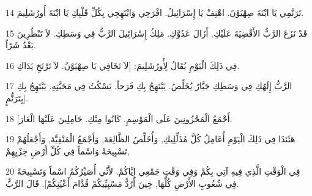 \par 14 تَرَنَّمِي يَا ابْنَةَ صِهْيَوْنَ. اهْتِفْ يَا إِسْرَائِيلُ. افْرَحِي وَابْتَهِجِي بِكُلِّ قَلْبِكِ يَا ابْنَةَ أُورُشَلِيمَ.
\par 15 قَدْ نَزَعَ الرَّبُّ الأَقْضِيَةَ عَلَيْكِ. أَزَالَ عَدُوَّكِ. مَلِكُ إِسْرَائِيلَ الرَّبُّ فِي وَسَطِكِ. لاَ تَنْظُرِينَ بَعْدُ شَرّاً.
\par 16 فِي ذَلِكَ الْيَوْمِ يُقَالُ لِأُورُشَلِيمَ: [لاَ تَخَافِي يَا صِهْيَوْنُ. لاَ تَرْتَخِ يَدَاكِ.
\par 17 الرَّبُّ إِلَهُكِ فِي وَسَطِكِ جَبَّارٌ يُخَلِّصُ. يَبْتَهِجُ بِكِ فَرَحاً. يَسْكُتُ فِي مَحَبَّتِهِ. يَبْتَهِجُ بِكِ بِتَرَنُّمٍ].
\par 18 [أَجْمَعُ الْمَحْزُونِينَ عَلَى الْمَوْسِمِ. كَانُوا مِنْكِ. حَامِلِينَ عَلَيْهَا الْعَارَ.
\par 19 هَئَنَذَا فِي ذَلِكَ الْيَوْمِ أُعَامِلُ كُلَّ مُذَلِّلِيكِ, وَأُخَلِّصُ الظَّالِعَةَ, وَأَجْمَعُ الْمَنْفِيَّةَ, وَأَجْعَلُهُمْ تَسْبِيحَةً وَاسْماً فِي كُلِّ أَرْضِ خِزْيِهِمْ,
\par 20 فِي الْوَقْتِ الَّذِي فِيهِ آتِي بِكُمْ وَفِي وَقْتِ جَمْعِي إِيَّاكُمْ. لأَنِّي أُصَيِّرُكُمُ اسْماً وَتَسْبِيحَةً فِي شُعُوبِ الأَرْضِ كُلِّهَا, حِينَ أَرُدُّ مَسْبِيِّيكُمْ قُدَّامَ أَعْيُنِكُمْ]. قَالَ الرَّبُّ.

